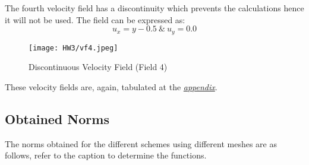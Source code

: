 \documentclass[a4paper, 12pt]{article}
\begin{document}
The fourth velocity field has a discontinuity which prevents the calculations hence it will not be used. The field can be expressed as:
\begin{equation*}
    u_x = y-0.5 \: \& \: u_y = 0.0
\end{equation*}
\vspace{-1.5cm}
\begin{figure}[H]
    \centering
    \texttt{[image: HW3/vf4.jpeg]}
    \caption{Discontinuous Velocity Field (Field 4)}
\end{figure}\par

These velocity fields are, again, tabulated at the \hyperref[ap2]{\textit{appendix}}.
\subsection{Obtained Norms}
The norms obtained for the different schemes using different meshes are as follows, refer to the caption to determine the functions.
\end{document}
